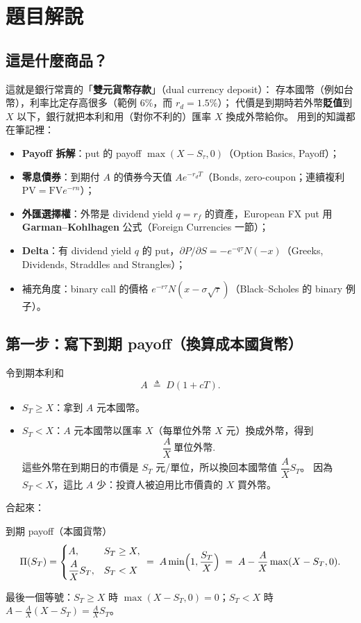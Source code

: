 \documentclass[11pt,a4paper]{article}
\begin{document}
\section{題目解說}

\subsection{這是什麼商品？}

這就是銀行常賣的「\textbf{雙元貨幣存款}」（dual currency deposit）：
存本國幣（例如台幣），利率比定存高很多（範例 $6\%$，而 $r_d=1.5\%$）；
代價是到期時若外幣\textbf{貶值}到 $X$ 以下，銀行就把本利和用（對你不利的）匯率 $X$ 換成外幣給你。
用到的知識都在筆記裡：
\begin{itemize}[nosep]
  \item \textbf{Payoff 拆解}：put 的 payoff $\max(X-S_\tau,0)$（Option Basics, Payoff）；
  \item \textbf{零息債券}：到期付 $A$ 的債券今天值 $Ae^{-r_dT}$（Bonds, zero-coupon；連續複利 $\mathrm{PV}=\mathrm{FV}e^{-rn}$）；
  \item \textbf{外匯選擇權}：外幣是 dividend yield $q=r_f$ 的資產，European FX put 用
        \textbf{Garman--Kohlhagen} 公式（Foreign Currencies 一節）；
  \item \textbf{Delta}：有 dividend yield $q$ 的 put，$\partial P/\partial S=-e^{-q\tau}N(-x)$（Greeks, Dividends, Straddles and Strangles）；
  \item 補充角度：binary call 的價格 $e^{-r\tau}N(x-\sigma\sqrt\tau)$（Black--Scholes 的 binary 例子）。
\end{itemize}

\subsection{第一步：寫下到期 payoff（換算成本國貨幣）}

令到期本利和
\[
  A\;\triangleq\;D(1+cT).
\]
\begin{itemize}
  \item $S_T\ge X$：拿到 $A$ 元本國幣。
  \item $S_T<X$：$A$ 元本國幣以匯率 $X$（每單位外幣 $X$ 元）換成外幣，得到
        \[
          \frac{A}{X}\ \text{單位外幣}.
        \]
        這些外幣在到期日的市價是 $S_T$ 元/單位，所以換回本國幣值 $\dfrac{A}{X}S_T$。
        因為 $S_T<X$，這比 $A$ 少：投資人被迫用比市價貴的 $X$ 買外幣。
\end{itemize}
合起來：
\begin{keybox}{到期 payoff（本國貨幣）}
\[
  \Pi(S_T)=\begin{cases}A, & S_T\ge X,\\[2pt] \dfrac{A}{X}S_T, & S_T<X\end{cases}
  \;=\;A\min\Bigl(1,\frac{S_T}{X}\Bigr)
  \;=\;A-\frac{A}{X}\max(X-S_T,0).
\]
\end{keybox}
最後一個等號：$S_T\ge X$ 時 $\max(X-S_T,0)=0$；$S_T<X$ 時 $A-\frac AX(X-S_T)=\frac AX S_T$。
\end{document}
